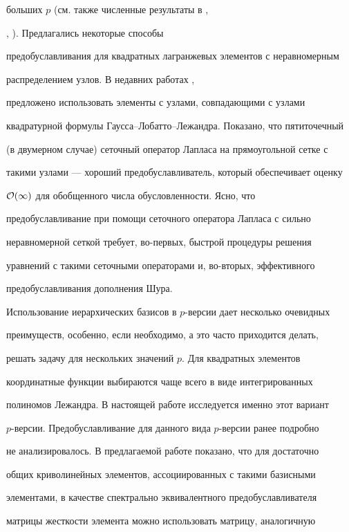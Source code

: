 больших $p$ (см. также численные результаты в \cite{iva-kor1},


\cite{car-bar}, \cite{mandel}). Предлагались некоторые способы


предобуславливания для квадратных лагранжевых элементов с неравномерным


распределением узлов. В недавних работах \cite{ber-mad}, \cite{canuto}


предложено использовать элементы с узлами, совпадающими с узлами


квадратурной формулы Гаусса--Лобатто--Лежандра. Показано, что пятиточечный


(в двумерном случае) сеточный оператор Лапласа на прямоугольной сетке с


такими узлами --- хороший предобуславливатель, который обеспечивает оценку


$\cal O(1)$ для обобщенного числа обусловленности. Ясно, что


предобуславливание при помощи сеточного оператора Лапласа с сильно


неравномерной сеткой требует, во-первых, быстрой процедуры решения


уравнений с такими сеточными операторами и, во-вторых, эффективного


предобуславливания дополнения Шура.





Использование иерархических базисов в $p$-версии дает несколько очевидных


преимуществ, особенно, если необходимо, а это часто приходится делать,


решать задачу для нескольких значений $p$. Для квадратных элементов


координатные функции выбираются чаще всего в виде интегрированных


полиномов Лежандра. В настоящей работе исследуется именно этот вариант


$p$-версии. Предобуславливание для данного вида $p$-версии ранее подробно


не анализировалось. В предлагаемой работе показано, что для достаточно


общих криволинейных элементов, ассоциированных с такими базисными


элементами, в качестве спектрально эквивалентного предобуславливателя


матрицы жесткости элемента можно использовать матрицу, аналогичную


